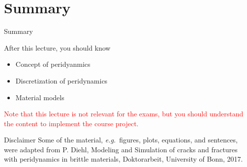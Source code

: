 \documentclass[\classoption]{beamer}
\begin{document}
\section{Summary}
\begin{frame}{Summary}
\begin{block}{After this lecture, you should know}
\begin{itemize}
\item Concept of peridyanmics
\item Discretization of peridynamics
\item Material models 
\end{itemize}
\end{block}

\begin{center}
\textcolor{red}{Note that this lecture is not relevant for the exams, but you should understand the content to implement the course project.}
\end{center}
\end{frame}



\begin{frame}{Disclaimer}
Some of the material, \emph{e.g.}\ figures, plots, equations, and sentences, were adapted from P. Diehl, Modeling and Simulation of cracks and fractures with peridynamics in brittle materials, Doktorarbeit, University of Bonn, 2017.\\



\end{frame}
\end{document}
